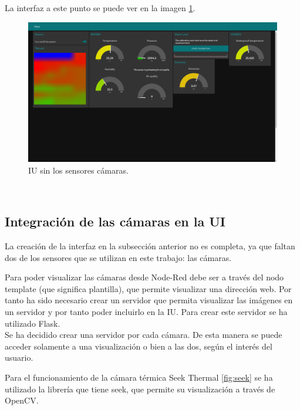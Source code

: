 La interfaz a este punto se puede ver en la imagen \ref{fig:ui_nocams}.
\begin{figure} [h!]
  \begin{center}
    \includegraphics[width=16cm]{figs/ui_nocams}
  \end{center}
  \caption{IU sin los sensores cámaras.}
  \label{fig:ui_nocams}
\end{figure}\\

\subsection{Integración de las cámaras en la UI}
La creación de la interfaz en la subsección anterior no es completa, ya que faltan dos de los sensores que se utilizan en este trabajo: las cámaras.

Para poder visualizar las cámaras desde Node-Red debe ser a través del nodo template (que significa plantilla), que permite visualizar una dirección web. Por tanto ha sido necesario crear un servidor que permita visualizar las imágenes en un servidor y por tanto poder incluirlo en la IU. Para crear este servidor se ha utilizado Flask.\\

Se ha decidido crear una servidor por cada cámara. De esta manera se puede acceder solamente a una visualización o bien a las dos, según el interés del usuario. 

Para el funcionamiento de la cámara térmica Seek Thermal \ref{fig:seek} se ha utilizado la librería que tiene seek, que permite su visualización a través de OpenCV.

